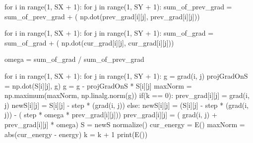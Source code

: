 \documentclass[ 12pt,x11names]{article}
\begin{document}
\begin{python}
    for i in range(1, SX + 1):
        for j in range(1, SY + 1):
            sum_of_prev_grad = sum_of_prev_grad + (
                np.dot(prev_grad[i][j], prev_grad[i][j]))

    for i in range(1, SX + 1):
        for j in range(1, SY + 1):
            sum_of_grad = sum_of_grad + (
                np.dot(cur_grad[i][j], cur_grad[i][j]))

    omega = sum_of_grad / sum_of_prev_grad

    for i in range(1, SX + 1):
        for j in range(1, SY + 1):
            g = grad(i,  j)
            projGradOnS = np.dot(S[i][j], g)
            g = g - projGradOnS * S[i][j]
            maxNorm = np.maximum(maxNorm, np.linalg.norm(g))
            if(k == 0):
                prev_grad[i][j] = grad(i, j)
                newS[i][j] = S[i][j] - step * (grad(i, j))
            else:
                newS[i][j] = (S[i][j] - step * (grad(i, j)) -
                             ( step * omega *  prev_grad[i][j]))
                prev_grad[i][j] = (
                    grad(i, j) + prev_grad[i][j] * omega)
    S = newS
    normalize()
    cur_energy = E()
    maxNorm = abs(cur_energy - energy)
    k = k + 1
print(E())

 \end{python}

\newpage
\end{document}
